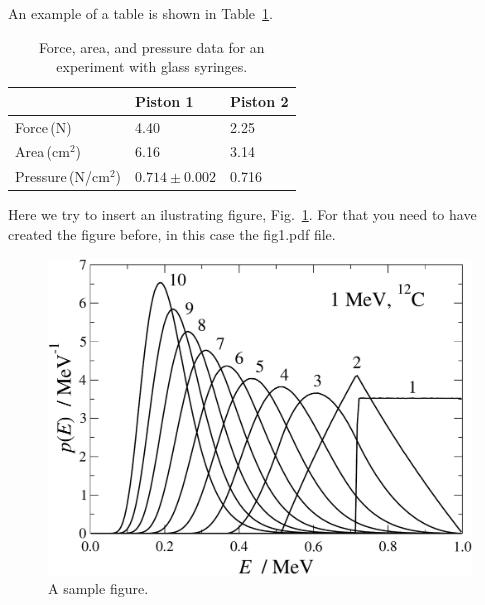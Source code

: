 \documentclass[twocolumn]{revtex4}
\begin{document}
An example of a table is shown in Table~\ref{tab:sample1}.

\begin{table}[h!]
\centering
\caption{Force, area, and pressure data for an experiment with glass syringes.}
\label{tab:sample1}
\vspace*{2mm}
\begin{tabular}{|l|l|l|}
\hline
& Piston 1 & Piston 2 \\
\hline
Force\,(N) & 4.40 & 2.25 \\
Area\,(cm$^2$) & 6.16 & 3.14 \\
Pressure\,(N/cm$^2$) & $0.714 \pm 0.002$ & 0.716 \\
\hline
\end{tabular}
\end{table}

Here we try to insert an ilustrating figure, Fig.~\ref{fig:sample}.
For that you need to have created the figure before, in this case
the fig1.pdf file.

\begin{figure}[h!]
\centering
\includegraphics[width=\columnwidth]{fig1.pdf}
\caption{A sample figure.}
\label{fig:sample}
\end{figure}

\end{document}
